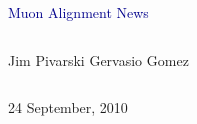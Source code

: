 \documentclass[compress]{beamer}
\begin{document}
\begin{frame}
\vfill
\begin{center}
\textcolor{darkblue}{\Large Muon Alignment News}

\vfill
\begin{columns}
\begin{center}
\large
Jim Pivarski \hspace{0.5 cm} Gervasio Gomez
\end{center}
\end{columns}

\vfill
24 September, 2010

\end{center}
\end{frame}


\small
\end{document}
